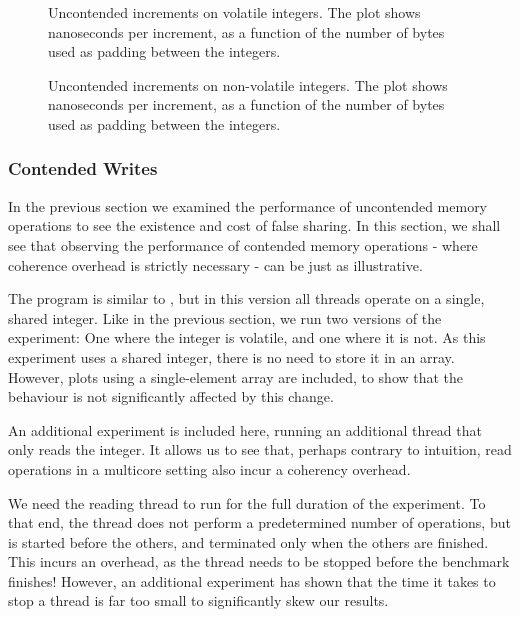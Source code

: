 \begin{figure}[hbpt]
\graphicspath{{plots/}}

\caption{Uncontended increments on volatile integers. The plot shows nanoseconds
	per increment, as a function of the number of bytes used as padding
	between the integers.}
	\label{fig:uncont}
\end{figure}

\begin{figure}[hbpt]
\graphicspath{{plots/}}

\caption{Uncontended increments on non-volatile integers. The plot shows nanoseconds
	per increment, as a function of the number of bytes used as padding
	between the integers.}
\label{fig:uncont-nob}
\end{figure}


\subsubsection{Contended Writes}

In the previous section we examined the performance of uncontended memory
operations to see the existence and cost of false sharing. In this section, we
shall see that observing the performance of contended memory operations - where
coherence overhead is strictly necessary - can be just as illustrative.


The program is similar to , but in this version all threads operate on a single, shared integer. Like in the previous
section, we run two versions of the experiment: One where the integer is
volatile, and one where it is not. As this experiment uses a shared integer,
there is no need to store it in an array. However, plots using a single-element
array are included, to show that the behaviour is not significantly affected by
this change.

An additional experiment is included here, running an additional thread that
only reads the integer. It allows us to see that, perhaps contrary to intuition,
read operations in a multicore setting also incur a coherency overhead.


We need the reading thread to run for the full duration of the experiment. To
that end, the thread does not perform a predetermined number of operations, but
is started before the others, and terminated only when the others are
finished. This incurs an overhead, as the thread needs to be stopped before the
benchmark finishes! However, an additional experiment has shown that the time it
takes to stop a thread is far too small to significantly skew our results.

